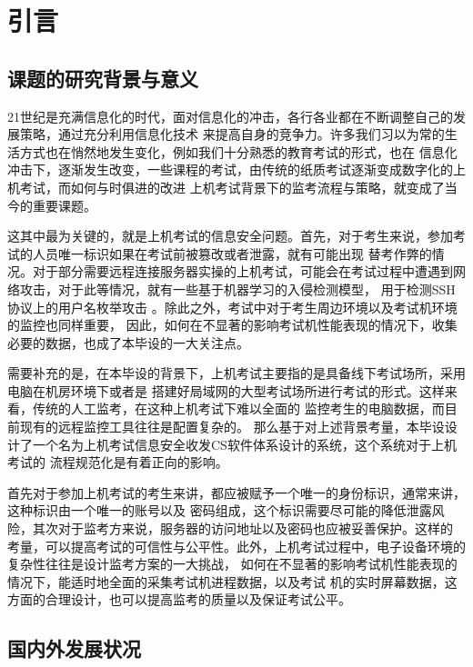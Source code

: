 \section{引言}
\subsection{课题的研究背景与意义}

21世纪是充满信息化的时代，面对信息化的冲击，各行各业都在不断调整自己的发展策略，通过充分利用信息化技术
来提高自身的竞争力。许多我们习以为常的生活方式也在悄然地发生变化，例如我们十分熟悉的教育考试的形式，也在
信息化冲击下，逐渐发生改变，一些课程的考试，由传统的纸质考试逐渐变成数字化的上机考试，而如何与时俱进的改进
上机考试背景下的监考流程与策略，就变成了当今的重要课题。

这其中最为关键的，就是上机考试的信息安全问题。首先，对于考生来说，参加考试的人员唯一标识如果在考试前被篡改或者泄露，就有可能出现
替考作弊的情况。对于部分需要远程连接服务器实操的上机考试，可能会在考试过程中遭遇到网络攻击，对于此等情况，就有一些基于机器学习的入侵检测模型，
用于检测SSH协议上的用户名枚举攻击 \cite{sym13112192}。除此之外，考试中对于考生周边环境以及考试机环境的监控也同样重要，
因此，如何在不显著的影响考试机性能表现的情况下，收集必要的数据，也成了本毕设的一大关注点。

需要补充的是，在本毕设的背景下，上机考试主要指的是具备线下考试场所，采用电脑在机房环境下或者是
搭建好局域网的大型考试场所进行考试的形式。这样来看，传统的人工监考，在这种上机考试下难以全面的
监控考生的电脑数据，而目前现有的远程监控工具往往是配置复杂的。
那么基于对上述背景考量，本毕设设计了一个名为上机考试信息安全收发CS软件体系设计的系统，这个系统对于上机考试的
流程规范化是有着正向的影响。

首先对于参加上机考试的考生来讲，都应被赋予一个唯一的身份标识，通常来讲，这种标识由一个唯一的账号以及
密码组成，这个标识需要尽可能的降低泄露风险，其次对于监考方来说，服务器的访问地址以及密码也应被妥善保护。这样的
 考量，可以提高考试的可信性与公平性。此外，上机考试过程中，电子设备环境的复杂性往往是设计监考方案的一大挑战，
 如何在不显著的影响考试机性能表现的情况下，能适时地全面的采集考试机进程数据，以及考试
 机的实时屏幕数据，这方面的合理设计，也可以提高监考的质量以及保证考试公平。


\subsection{国内外发展状况}

